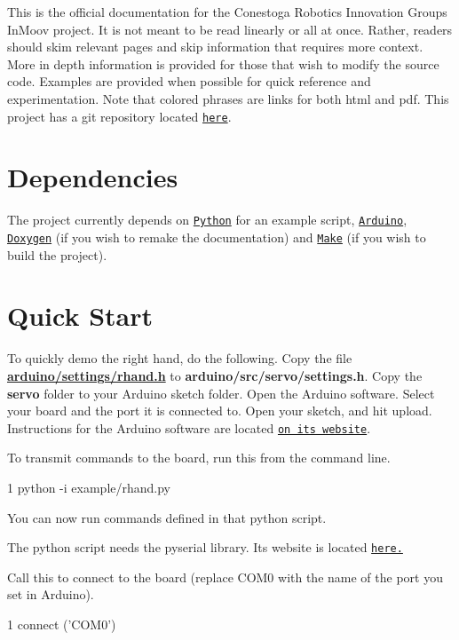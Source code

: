 This is the official documentation for the Conestoga Robotics Innovation Group\textquotesingle{}s In\+Moov project. It is not meant to be read linearly or all at once. Rather, readers should skim relevant pages and skip information that requires more context. More in depth information is provided for those that wish to modify the source code. Examples are provided when possible for quick reference and experimentation. Note that colored phrases are links for both html and pdf. This project has a git repository located \href{https://github.com/rbong/rig-inmoov}{\tt here}.\hypertarget{index_Dependencies}{}\section{Dependencies}\label{index_Dependencies}
The project currently depends on \href{http://www.python.org}{\tt Python} for an example script, \href{http://www.arduino.cc}{\tt Arduino}, \href{http://www.stack.nl/~dimitri/doxygen/}{\tt Doxygen} (if you wish to remake the documentation) and \href{http://www.gnu.org/software/make/}{\tt Make} (if you wish to build the project).\hypertarget{index_Quick_Start}{}\section{Quick Start}\label{index_Quick_Start}
To quickly demo the right hand, do the following. Copy the file {\bfseries \hyperlink{rhand_8h}{arduino/settings/rhand.\+h}} to {\bfseries arduino/src/servo/settings.\+h}. Copy the {\bfseries servo} folder to your Arduino sketch folder. Open the Arduino software. Select your board and the port it is connected to. Open your sketch, and hit upload. Instructions for the Arduino software are located \href{http://www.arduino.cc}{\tt on its website}.

To transmit commands to the board, run this from the command line. 
\begin{DoxyCode}
1 python -i example/rhand.py
\end{DoxyCode}
 You can now run commands defined in that python script.

The python script needs the pyserial library. Its website is located \href{http://pyserial.sourceforge.net/}{\tt here.}

Call this to connect to the board (replace C\+O\+M0 with the name of the port you set in Arduino). 
\begin{DoxyCode}
1 connect (\textcolor{stringliteral}{'COM0'})
\end{DoxyCode}


